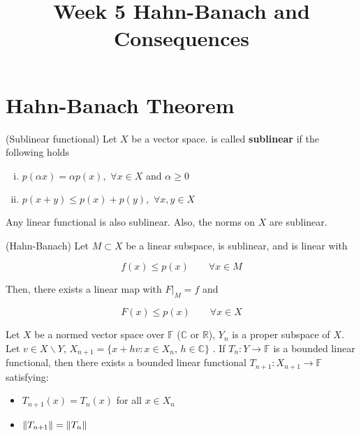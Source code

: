\documentclass{article}
\title{Week 5 Hahn-Banach and Consequences}
\begin{document}
\maketitle

\section{Hahn-Banach Theorem} 

\begin{definition}
\label{sublinear map}
(Sublinear functional)
	Let $X$ be a vector space.  is called \textbf{sublinear} if the following holds
	\begin{enumerate}[i)]
		\item $p( \alpha x)= \alpha p(x),$ $\forall x\in X$ and $\alpha\geq0$
		\item $p(x+y) \leq p(x)+p(y),\,\,\forall x,y\in X$
	\end{enumerate}
\end{definition}

\begin{example}
    Any linear functional is also sublinear. Also, the norms on $X$ are sublinear.
\end{example}  

\begin{theorem}
(Hahn-Banach)
	Let $M\subset X$ be a linear subspace,  is sublinear, and  is linear with 
	
	$$
	f(x)\leq p(x) \qquad \forall x\in M
	$$
	
	Then, there exists a linear map  with $F|_M=f$ and
	
	$$F(x)\leq p(x) \qquad \forall x\in X$$
\end{theorem}

\begin{lemma}
\label{ODEX}
	Let $X$ be a normed vector space over $\mathbb F$ ($\mathbb{C}$ or $\mathbb{R}$), $Y_n$ is a proper subspace of $X$. Let $v\in X\backslash Y$, $X_{n+1}=\{x+hv:x\in X_n,\,h\in\mathbb{C}\}$
	. If $T_n:Y\xrightarrow{}\mathbb{F}$ is a bounded linear functional, then there exists a bounded linear functional $T_{n+1}:X_{n+1}\xrightarrow{}\mathbb{F}$ satisfying:
	\begin{itemize}
		\item $T_{n+1}(x)=T_n(x)$ for all $x\in X_n$
		\item $\left\|{T_{n+1}}\right\|=\left\|{T_n}\right\|$
	\end{itemize}
\end{lemma}
\end{document}
